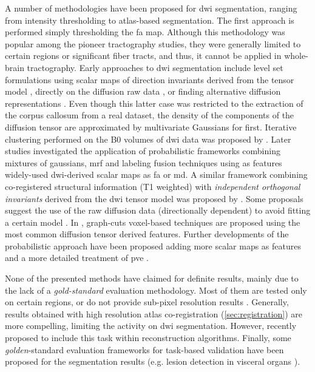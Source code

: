 A number of methodologies have been proposed for \gls{dwi} segmentation, ranging
  from intensity thresholding to atlas-based segmentation.
The first approach is performed simply thresholding the \gls{fa} map.
Although this methodology was popular among the pioneer tractography studies,
  they were generally limited to certain regions or significant fiber tracts, and thus,
  it cannot be applied in whole-brain tractography.
Early approaches to \gls{dwi} segmentation
  include level set formulations using scalar maps of direction invariants derived
  from the tensor model \citep{zhukov_level_2003}, directly on the diffusion raw data
  \citep{rousson_level_2004}, or finding alternative diffusion representations
  \citep{jonasson_representing_2007}.
Even though this latter case was restricted to the extraction of
  the corpus callosum from a real dataset, the density of the components of the diffusion tensor
  are approximated by multivariate Gaussians for first.
Iterative clustering performed on the B0 volumes of \gls{dwi} data was proposed by
  \citep{hadjiprocopis_unbiased_2005}.
Later studies investigated the application of probabilistic frameworks combining mixtures of
  gaussians, \gls{mrf} and labeling fusion techniques \citep{liu_brain_2007} using as features
  widely-used \gls{dwi}-derived scalar maps as \gls{fa} or \gls{md}.
A similar framework combining co-registered structural information (T1 weighted) with
  \emph{independent orthogonal invariants} derived from the \gls{dwi} tensor model was proposed
  by \citep{awate_multivariate_2008}.
Some proposals suggest the use of the raw diffusion data (directionally dependent) to avoid fitting
  a certain model \citep{lu_segmentation_2008}.
In \citep{han_experimental_2009}, graph-cuts voxel-based techniques are proposed using the most
  common diffusion tensor derived features.
Further developments of the probabilistic approach have been proposed adding more scalar maps
  as features and a more detailed treatment of \gls{pve} \citep{kumazawa_partial_2010}.


None of the presented methods have claimed for definite results, mainly due to the lack of
  a \emph{gold-standard} evaluation methodology.
Most of them are tested only on certain
  regions, or do not provide sub-pixel resolution results
  \citep{hadjiprocopis_unbiased_2005,liu_brain_2007,awate_multivariate_2008,lu_segmentation_2008,
  han_experimental_2009}.
Generally, results obtained with high resolution atlas co-registration
  (\autoref{sec:registration}) are more compelling, limiting the activity on \gls{dwi}
  segmentation.
However, recently \citep{kumazawa_improvement_2013} proposed to include this
  task within reconstruction algorithms.
Finally, some \emph{golden}-standard evaluation frameworks for task-based validation have been
  proposed for the segmentation results (e.g. lesion detection in visceral organs
  \citep{jha_taskbased_2012}).


